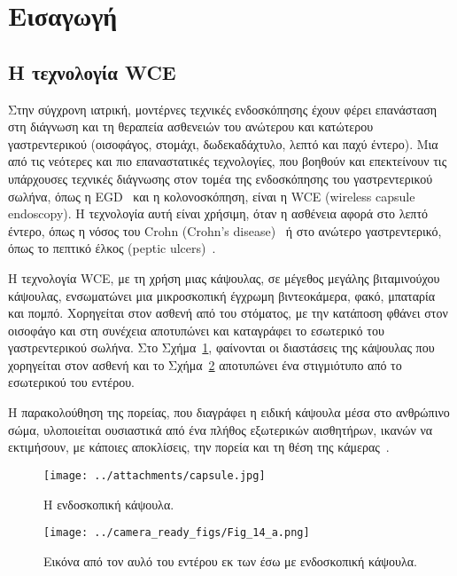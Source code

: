 
\section{Εισαγωγή}

\subsection{H τεχνολογία WCE}
 
Στην σύγχρονη ιατρική, μοντέρνες τεχνικές ενδοσκόπησης έχουν φέρει επανάσταση στη διάγνωση και τη θεραπεία ασθενειών
του ανώτερου και κατώτερου γαστρεντερικού (οισοφάγος, στομάχι, δωδεκαδάχτυλο, λεπτό και παχύ έντερο). 
Μια από τις νεότερες και πιο επαναστατικές τεχνολογίες, που βοηθούν και επεκτείνουν τις υπάρχουσες τεχνικές διάγνωσης στον τομέα της ενδοσκόπησης του γαστρεντερικού σωλήνα, όπως η EGD~\cite{egd} και η κολονοσκόπηση,
είναι η WCE (wireless capsule endoscopy). H τεχνολογία αυτή είναι χρήσιμη, όταν η ασθένεια αφορά στο λεπτό έντερο, όπως η νόσος του Crohn (Crohn's disease)~\cite{crohns} ή στο ανώτερο γαστρεντερικό, όπως το πεπτικό έλκος (peptic ulcers)~\cite{peptic}. \par
Η τεχνολογία WCE, με τη χρήση μιας κάψουλας, σε μέγεθος μεγάλης βιταμινούχου κάψουλας, ενσωματώνει μια μικροσκοπική έγχρωμη βιντεοκάμερα, φακό, μπαταρία και πομπό. Χορηγείται στον ασθενή από του στόματος, με την κατάποση φθάνει στον
οισοφάγο και στη συνέχεια αποτυπώνει και καταγράφει το εσωτερικό του γαστρεντερικού σωλήνα. Στο Σχήμα~\ref{fig:capsule_endoscopy}, φαίνονται οι διαστάσεις της κάψουλας που χορηγείται στον ασθενή και το Σχήμα~\ref{fig:capsule_fig} αποτυπώνει
ένα στιγμιότυπο από το εσωτερικού του εντέρου.\par
Η παρακολούθηση της πορείας, που διαγράφει η ειδική κάψουλα μέσα στο ανθρώπινο σώμα, υλοποιείται ουσιαστικά από ένα πλήθος εξωτερικών αισθητήρων, 
ικανών να εκτιμήσουν, με κάποιες αποκλίσεις, την πορεία και τη θέση της κάμερας~\cite{spyrou2013panoramic,spyrou2012homography,capsend}. 

\newpage

\begin{figure}[!ht]
\begin{minipage}[b]{1.0\linewidth}
\centering
\texttt{[image: ../attachments/capsule.jpg]}
\end{minipage}
\caption{H ενδοσκοπική κάψουλα.}
\label{fig:capsule_endoscopy}  %
\end{figure} 

\begin{figure}[!ht]
\begin{minipage}[b]{1.0\linewidth}
\centering
\texttt{[image: ../camera\_ready\_figs/Fig\_14\_a.png]}
\end{minipage}
\caption{Εικόνα από τον αυλό του εντέρου εκ των έσω με ενδοσκοπική κάψουλα.}
\label{fig:capsule_fig}
\end{figure} 




